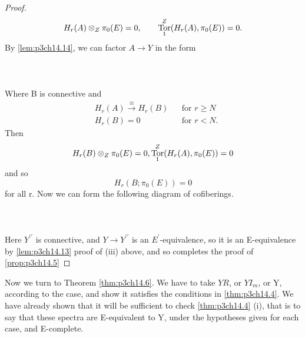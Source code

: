 \documentclass[../main]{subfiles}
\begin{document}
\begin{lemma}
\begin{proof}
  $$
  H_{r}(A)\otimes_{Z} \pi_{0}(E)=0, \qquad \mathop{\mathrm{Tor}}^Z_{1} (H_{r}(A), \pi_{0}(E))=0.
  $$ 
  By \ref{lem:p3ch14.14}, we can factor $A\to Y$ in the form
  ~\\~\\
  ~\\~\\
 Where B is connective and 
 \begin{align*}
   &H_{r}(A) \xrightarrow{\cong} H_{r}(B)  &&\text{for $r\ge N$}\\[0.5em]
   &H_{r}(B) =  0    &&\text{for $r < N$}.
 \end{align*} 
 Then 
 $$
 H_{r}(B) \otimes_{Z} \pi_{0}(E)=0, \mathop{\mathrm{Tor}}^Z_{1} (H_{r}(A), \pi_{0}(E))=0 
 $$ 
 and so 
 $$
   H_{r}(B; \pi_{0}(E))=0 
 $$ 
 for all r. Now we can form the following diagram of cofiberings.
 ~\\~\\
 ~\\~\\
 Here $Y^{\prime\prime}$ is connective, and $Y \to Y^{\prime\prime}$ is an $E^{\prime}$-equivalence, so it is an E-equivalence by \ref{lem:p3ch14.13} proof of (iii) above, and so completes the proof of  \ref{prop:p3ch14.5}
\end{proof}
\end{lemma}

Now we turn to Theorem \ref{thm:p3ch14.6}. We have to take $YR$, or  $YI_{m}$, or Y, according to the case, and show it satisfies the conditions in \ref{thm:p3ch14.4}. We have already shown that it will be sufficient to check \ref{thm:p3ch14.4} (i), that is to say that these spectra are E-equivalent to Y, under the hypotheses given for each case, and E-complete. 
\end{document}
